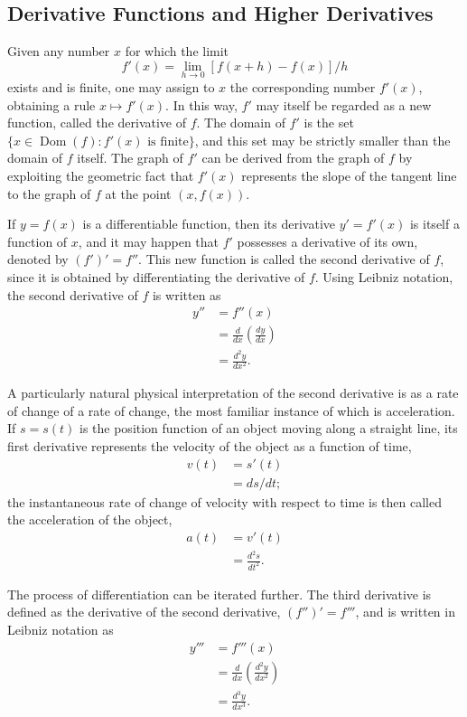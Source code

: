\subsection{Derivative Functions and Higher Derivatives}

Given any number $x$ for which the limit \[
f'(x) = \lim_{h \to 0} [f(x+h) - f(x)]/h
\] exists and is finite, one may assign to $x$ the corresponding number $f'(x)$, obtaining a rule $x \mapsto f'(x)$. In this way, $f'$ may itself be regarded as a new function, called the derivative of $f$. The domain of $f'$ is the set $\{x \in \operatorname{Dom}(f) : f'(x) \text{ is finite}\}$, and this set may be strictly smaller than the domain of $f$ itself. The graph of $f'$ can be derived from the graph of $f$ by exploiting the geometric fact that $f'(x)$ represents the slope of the tangent line to the graph of $f$ at the point $(x, f(x))$.


If $y = f(x)$ is a differentiable function, then its derivative $y' = f'(x)$ is itself a function of $x$, and it may happen that $f'$ possesses a derivative of its own, denoted by $(f')' = f''$. This new function is called the second derivative of $f$, since it is obtained by differentiating the derivative of $f$. Using Leibniz notation, the second derivative of $f$ is written as
\[
\begin{aligned}
y'' &= f''(x) \\
&= \frac{d}{dx}\left( \frac{dy}{dx} \right) \\
&= \frac{d^2 y}{dx^2}.
\end{aligned}
\]

A particularly natural physical interpretation of the second derivative is as a rate of change of a rate of change, the most familiar instance of which is acceleration. If $s = s(t)$ is the position function of an object moving along a straight line, its first derivative represents the velocity of the object as a function of time,
\[
\begin{aligned}
v(t) &= s'(t) \\
&= ds/dt;
\end{aligned}
\]
the instantaneous rate of change of velocity with respect to time is then called the acceleration of the object,
\[
\begin{aligned}
a(t) &= v'(t) \\
&= \frac{d^2 s}{dt^2}.
\end{aligned}
\]

The process of differentiation can be iterated further. The third derivative is defined as the derivative of the second derivative, $(f'')' = f'''$, and is written in Leibniz notation as
\[
\begin{aligned}
y''' &= f'''(x) \\
&= \frac{d}{dx}\left( \frac{d^2 y}{dx^2} \right) \\
&= \frac{d^3 y}{dx^3}.
\end{aligned}
\]

